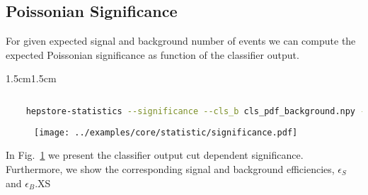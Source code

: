\subsection{Poissonian Significance}
For given expected signal and background number of events we can
compute the expected Poissonian significance as function of the
classifier output.
%
\begin{changemargin}{1.5cm}{1.5cm} 
  \begin{lstlisting}[language=Bash]
    
    hepstore-statistics --significance --cls_b cls_pdf_background.npy --cls_s cls_pdf_signal.npy --xsec_s 0.5 --xsec_b 10. --luminosity 100.
  \end{lstlisting}
\end{changemargin}
%
%
\begin{figure}
  \centering
  \texttt{[image: ../examples/core/statistic/significance.pdf]}
  \caption{}
  \label{fig:example_statistic}
\end{figure}
%
In Fig.~\ref{fig:example_statistic} we present the classifier output
cut dependent significance. Furthermore, we show the corresponding
signal and background efficiencies, $\epsilon_S$ and $\epsilon_B$.XS


